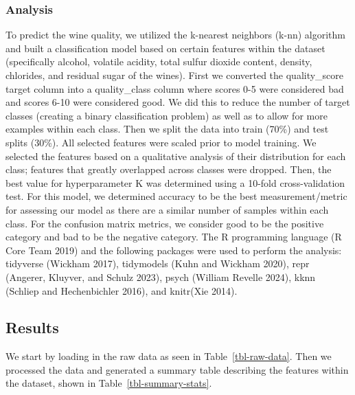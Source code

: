 \documentclass[
  letterpaper,
  DIV=11,
  numbers=noendperiod]{scrartcl}
\begin{document}
\subsubsection{Analysis}\label{analysis}

To predict the wine quality, we utilized the k-nearest neighbors (k-nn)
algorithm and built a classification model based on certain features
within the dataset (specifically alcohol, volatile acidity, total sulfur
dioxide content, density, chlorides, and residual sugar of the wines).
First we converted the quality\_score target column into a
quality\_class column where scores 0-5 were considered bad and scores
6-10 were considered good. We did this to reduce the number of target
classes (creating a binary classification problem) as well as to allow
for more examples within each class. Then we split the data into train
(70\%) and test splits (30\%). All selected features were scaled prior
to model training. We selected the features based on a qualitative
analysis of their distribution for each class; features that greatly
overlapped across classes were dropped. Then, the best value for
hyperparameter K was determined using a 10-fold cross-validation test.
For this model, we determined accuracy to be the best measurement/metric
for assessing our model as there are a similar number of samples within
each class. For the confusion matrix metrics, we consider good to be the
positive category and bad to be the negative category. The R programming
language (R Core Team 2019) and the following packages were used to
perform the analysis: tidyverse (Wickham 2017), tidymodels (Kuhn and
Wickham 2020), repr (Angerer, Kluyver, and Schulz 2023), psych (William
Revelle 2024), kknn (Schliep and Hechenbichler 2016), and knitr(Xie
2014).

\subsection{Results}\label{results}

We start by loading in the raw data as seen in Table~\ref{tbl-raw-data}.
Then we processed the data and generated a summary table describing the
features within the dataset, shown in Table~\ref{tbl-summary-stats}.
\end{document}
